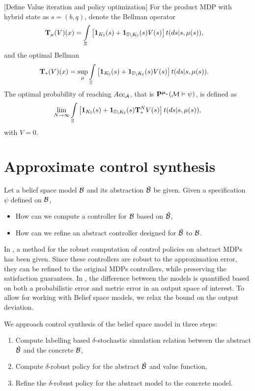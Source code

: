 \documentclass{ifacconf}
\newcommand{\red}[1]{{\color{red} #1}}
\begin{document}
\red{[Define Value iteration and policy optimization]}
For the product MDP with hybrid state as $s=(b, q)$, denote the Bellman operator
\begin{align}\label{eq:V_recopt_inf}
& \Bel_\pol (V)(x) =\int_{\bar{\X}}\left[\mathbf 1_{K_\S}(\bar s)+ \mathbf 1_{\S\setminus K_\S}(\bar s) V(\bar s)\right]\bar{\tr}(d\bar s|s,\pol(s)),
\end{align}
and the optimal Bellman 
\begin{align}\label{eq:V_recopt_inf}
& \Bel_\ast (V)(x) =\sup_\pol\int_{\S}\left[\mathbf 1_{K_\S}(\bar s)+ \mathbf 1_{\S\setminus K_\S}(\bar s) V(\bar s)\right]\bar{\tr} (d\bar s|s,\pol(s)).
\end{align}
The optimal probability of reaching $Acc_{\mathcal{A}}$, that is $\mathbf{P}^{{\boldsymbol{\mu}}_\ast}(\mathcal{M}\vDash\psi) $, is defined as
\begin{align}
	\lim_{N\rightarrow \infty}\int_{\S}\left[\mathbf 1_{K_\S}(\bar s)+ \mathbf 1_{\S\setminus K_\S}(\bar s) \Bel^N_\ast V(\bar s)\right]\bar{\tr} (d\bar s|s,\pol(s)),
\end{align}
with $V=0$.

\section{Approximate control synthesis}
 Let a belief space model $\mathcal{B}$ and its abstraction $\tilde {\mathcal{B}}$ be given.  Given a specification $\psi$ defined on $\mathcal{B}$,  \begin{itemize}
	\item How can we compute a controller for $\mathcal{B}$ based on $\tilde {\mathcal{B}}$,
	\item How can we refine an abstract controller designed for $\tilde{\mathcal{B}}$ to $\mathcal{B}$.
\end{itemize}

In \citet{tech_report_TACAS}, a method for the robust computation of control policies on abstract MDPs has been given.  Since these controllers are robust to the approximation error,  they can be refined to the original MDPs controllers, while preserving the satisfaction guarantees. 
In \citet{tech_report_TACAS}, the difference between the models is quantified based on both a probabilistic error and metric error in an output space of interest. 
To allow for working with Belief space models, we relax the bound on the output deviation.


We approach control synthesis of the belief space model in three steps:
\begin{enumerate}
\item Compute labelling based $\delta$-stochastic  simulation relation between  the abstract $\tilde{\mathcal{B}}$ and the concrete $\mathcal{B}$,
\item Compute $\delta$-robust policy for the abstract $\tilde{\mathcal{B}}$ and value function,
\item Refine the $\delta$-robust policy for the abstract model to the concrete model.
\end{enumerate}
\end{document}
